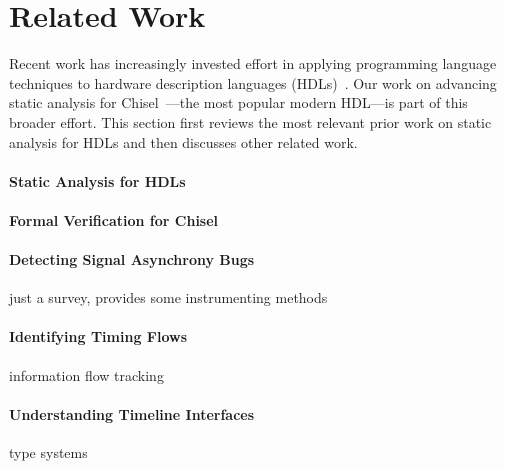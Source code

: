 \section{Related Work}

Recent work has increasingly invested effort in applying programming language techniques to hardware description languages (HDLs)~\cite{truong_golden_2019,chen_essence_2023,schuiki_llhd_2020,loow_simulation_2025,nigam_modular_2023,christensen_wire_2021,bourgeat_making_2025,jang_modular_2024,sisco_loop_2023,zagieboylo_pdl_2022,bourgeat_essence_2020,vega_reticle_2021,koeplinger_spatial_2018,durst_type-directed_2020,pelton_wavefront_2024,choi_revamping_2025,malik_circuit_2025,chen_allo_2024,nigam_predictable_2020,lee_optimizing_2020,herklotz_hyperblock_2024,law_mechanized_2025,kim_unifying_2024,fehr_first-class_2025,cui_chisa_2026,yan_verieq_2026,chen_exploiting_2026,kong_improving_2026}.
Our work on advancing static analysis for Chisel~\cite{bachrach_chisel_2012,izraelevitz_reusability_2017}---the most popular modern HDL---is part of this broader effort.
This section first reviews the most relevant prior work on static analysis for HDLs and then discusses other related work.

\paragraph{Static Analysis for HDLs}


\paragraph{Formal Verification for Chisel}


\paragraph{Detecting Signal Asynchrony Bugs}

just a survey, provides some instrumenting methods

\paragraph{Identifying Timing Flows}

information flow tracking

\paragraph{Understanding Timeline Interfaces}

type systems
